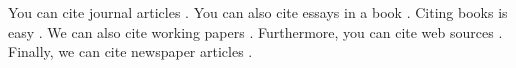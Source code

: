 \documentclass{article}
\begin{document}
You can cite journal articles \cite{journalarticle}. You can also cite essays in a book \citep{incollection}. Citing books is easy \citep{book}. We can also cite working papers \citep{workingpaper}. Furthermore, you can cite web sources \citep{webresource}. Finally, we can cite newspaper articles \citep{newsarticle}.



\end{document}
